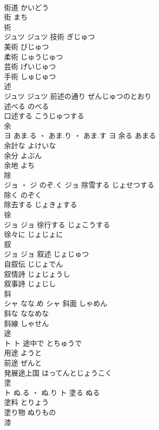 \documentclass[8pt]{extreport}
\begin{document}
\begin{CJK}{UTF8}{min}
\\	街道	かいどう	
\\	街	まち	
\\	術	
\\	ジュツ		ジュツ	技術	ぎじゅつ	
\\	美術	びじゅつ	
\\	柔術	じゅうじゅつ	
\\	芸術	げいじゅつ	
\\	手術	しゅじゅつ	
\\	述	
\\	ジュツ		ジュツ	前述の通り	ぜんじゅつのとおり	
\\	述べる	のべる	
\\	口述する	こうじゅつする	
\\	余	
\\	ヨ	あま.る ・ あま.り ・ あま.す	ヨ	余る	あまる	
\\	余計な	よけいな	
\\	余分	よぶん	
\\	余地	よち	
\\	除	
\\	ジョ ・ ジ	のぞ.く	ジョ	除雪する	じょせつする	
\\	除く	のぞく	
\\	除去する	じょきょする	
\\	徐	
\\	ジョ		ジョ	徐行する	じょこうする	
\\	徐々に	じょじょに	
\\	叙	
\\	ジョ		ジョ	叙述	じょじゅつ	
\\	自叙伝	じじょでん	
\\	叙情詩	じょじょうし	
\\	叙事詩	じょじし	
\\	斜	
\\	シャ	なな.め	シャ	斜面	しゃめん	
\\	斜な	ななめな	
\\	斜線	しゃせん	
\\	途	
\\	ト		ト	途中で	とちゅうで	
\\	用途	ようと	
\\	前途	ぜんと	
\\	発展途上国	はってんとじょうこく	
\\	塗	
\\	ト	ぬ.る ・ ぬ.り	ト	塗る	ぬる	
\\	塗料	とりょう	
\\	塗り物	ぬりもの	
\\	漆	

\end{CJK}
\end{document}
